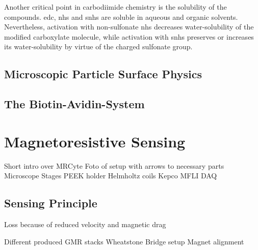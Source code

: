 Another critical point in carbodiimide chemistry is the solubility of the compounds. \gls{edc}, \gls{nhs} and \gls{snhs} are soluble in aqueous and organic solvents. Nevertheless, activation  with  non-sulfonate \gls{nhs} decreases water-solubility of the modified carboxylate molecule, while activation with \gls{snhs} preserves or increases its water-solubility by virtue of the charged sulfonate group. \cite{lit:chem:snhs}

\clearpage

\subsection{Microscopic Particle Surface Physics}

\subsection{The Biotin-Avidin-System}


\section{Magnetoresistive Sensing}
Short intro over MRCyte
Foto of setup with arrows to necessary parts
Microscope
Stages
PEEK holder
Helmholtz coils
Kepco
MFLI
DAQ


\subsection{Sensing Principle}

Loss because of reduced velocity and magnetic drag

Different produced GMR stacks
Wheatstone Bridge setup
Magnet alignment

